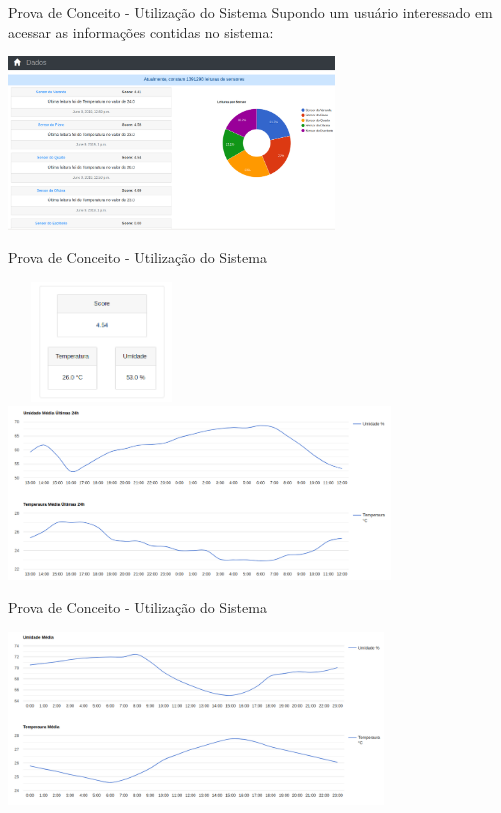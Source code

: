 \documentclass{beamer}
\begin{document}
    \begin{frame}{Prova de Conceito - Utilização do Sistema}
      \quad Supondo um usuário interessado em acessar as informações contidas no sistema:
      \begin{center}
      \includegraphics[height=130pt, width=\textwidth]{prova8}
      \end{center}
    \end{frame}
    \begin{frame}{Prova de Conceito - Utilização do Sistema}
      \begin{center}
        \includegraphics[height=90pt, width=140pt]{prova9}
        \includegraphics[height=130pt, width=\textwidth]{prova10}
      \end{center}
    \end{frame}
    \begin{frame}{Prova de Conceito - Utilização do Sistema}
      \begin{center}
        \includegraphics[height=130pt, width=\textwidth]{prova11}
      \end{center}
    \end{frame}
\end{document}
